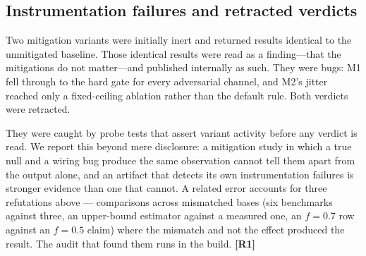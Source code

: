 \subsection{Instrumentation failures and retracted verdicts}

Two mitigation variants were initially inert and returned results identical to
the unmitigated baseline. Those identical results were read as a finding---that
the mitigations do not matter---and published internally as such. They were bugs:
M1 fell through to the hard gate for every adversarial channel, and M2's jitter
reached only a fixed-ceiling ablation rather than the default rule. Both verdicts
were retracted.

They were caught by probe tests that assert variant activity before any verdict
is read. We report this beyond mere disclosure: a mitigation study in which a
true null and a wiring bug produce the same observation cannot tell them apart
from the output alone, and an artifact that detects its own instrumentation
failures is stronger evidence than one that cannot. A related error accounts for
three refutations above --- comparisons across mismatched bases (six benchmarks
against three, an upper-bound estimator against a measured one, an $f=0.7$ row
against an $f=0.5$ claim) where the mismatch and not the effect produced the
result. The audit that found them runs in the build. \textbf{[R1]}

